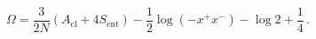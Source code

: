 \begin{equation}
\Omega = \frac{3}{2N} \left( A_{\text{cl}} + 4S_{\text{ent}}
\right) -\frac{1}{2} \log (-x^+ x^-) - \log 2 + \frac{1}{4}\, .
\end{equation}

